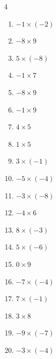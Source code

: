 \begin{multicols}{4}
\begin{enumerate}
  \item $-1\times (-2)$
        \phantom{$=2$}

  \item $-8\times 9$
        \phantom{$=-72$}

  \item $5\times (-8)$
        \phantom{$=-40$}

  \item $-1\times 7$
        \phantom{$=-7$}

  \item $-8\times 9$
        \phantom{$=-72$}

  \item $-1\times 9$
        \phantom{$=-9$}

  \item $4\times 5$
        \phantom{$=20$}

  \item $1\times 5$
        \phantom{$=5$}

  \item $3\times (-1)$
        \phantom{$=-3$}

  \item $-5\times (-4)$
        \phantom{$=20$}

  \item $-3\times (-8)$
        \phantom{$=24$}

  \item $-4\times 6$
        \phantom{$=-24$}

  \item $8\times (-3)$
        \phantom{$=-24$}

  \item $5\times (-6)$
        \phantom{$=-30$}

  \item $0\times 9$
        \phantom{$=0$}

  \item $-7\times (-4)$
        \phantom{$=28$}

  \item $7\times (-1)$
        \phantom{$=-7$}

  \item $3\times 8$
        \phantom{$=24$}

  \item $-9\times (-7)$
        \phantom{$=63$}

  \item $-3\times (-4)$
        \phantom{$=12$}

\columnbreak %


\end{enumerate}
\end{multicols}
